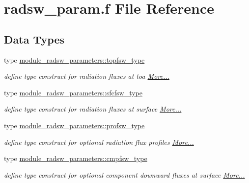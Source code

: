 \hypertarget{radsw__param_8f}{}\section{radsw\+\_\+param.\+f File Reference}
\label{radsw__param_8f}
\subsection*{Data Types}
\begin{DoxyCompactItemize}
\item 
type \hyperlink{namespacemodule__radsw__parameters_structmodule__radsw__parameters_1_1topfsw__type}{module\+\_\+radsw\+\_\+parameters\+::topfsw\+\_\+type}
\begin{DoxyCompactList}\small\item\em define type construct for radiation fluxes at toa  \hyperlink{namespacemodule__radsw__parameters_structmodule__radsw__parameters_1_1topfsw__type}{More...}\end{DoxyCompactList}\item 
type \hyperlink{namespacemodule__radsw__parameters_structmodule__radsw__parameters_1_1sfcfsw__type}{module\+\_\+radsw\+\_\+parameters\+::sfcfsw\+\_\+type}
\begin{DoxyCompactList}\small\item\em define type construct for radiation fluxes at surface  \hyperlink{namespacemodule__radsw__parameters_structmodule__radsw__parameters_1_1sfcfsw__type}{More...}\end{DoxyCompactList}\item 
type \hyperlink{namespacemodule__radsw__parameters_structmodule__radsw__parameters_1_1profsw__type}{module\+\_\+radsw\+\_\+parameters\+::profsw\+\_\+type}
\begin{DoxyCompactList}\small\item\em define type construct for optional radiation flux profiles  \hyperlink{namespacemodule__radsw__parameters_structmodule__radsw__parameters_1_1profsw__type}{More...}\end{DoxyCompactList}\item 
type \hyperlink{namespacemodule__radsw__parameters_structmodule__radsw__parameters_1_1cmpfsw__type}{module\+\_\+radsw\+\_\+parameters\+::cmpfsw\+\_\+type}
\begin{DoxyCompactList}\small\item\em define type construct for optional component downward fluxes at surface  \hyperlink{namespacemodule__radsw__parameters_structmodule__radsw__parameters_1_1cmpfsw__type}{More...}\end{DoxyCompactList}\end{DoxyCompactItemize}
